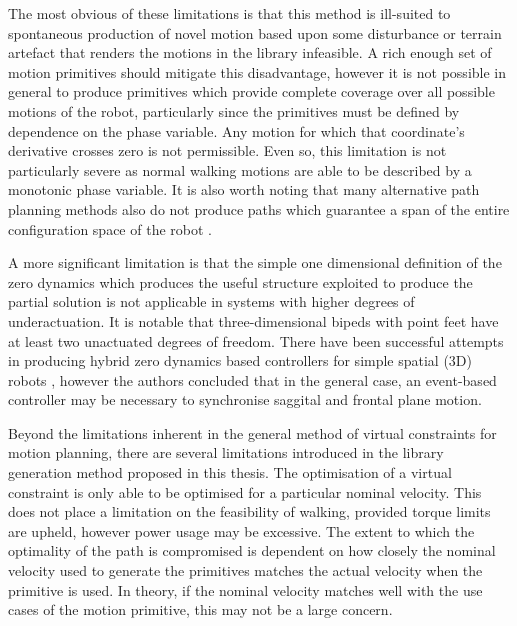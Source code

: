 The most obvious of these limitations is that this method is ill-suited to spontaneous production of novel motion based upon some disturbance or terrain artefact that renders the motions in the library infeasible. A rich enough set of motion primitives should mitigate this disadvantage, however it is not possible in general to produce primitives which provide complete coverage over all possible motions of the robot, particularly since the primitives must be defined by dependence on the phase variable. Any motion for which that coordinate's derivative crosses zero is not permissible. Even so, this limitation is not particularly severe as normal walking motions are able to be described by a monotonic phase variable. It is also worth noting that many alternative path planning methods also do not produce paths which guarantee a span of the entire configuration space of the robot \cite{boor1999gaussian, lavalle2001randomized, frazzoli2002real}. 


A more significant limitation is that the simple one dimensional definition of the zero dynamics which produces the useful structure exploited to produce the partial solution is not applicable in systems with higher degrees of underactuation. It is notable that three-dimensional bipeds with point feet have at least two unactuated degrees of freedom. There have been successful attempts in producing hybrid zero dynamics based controllers for simple spatial (3D) robots \cite{shih2007asymptotically}, however the authors concluded that in the general case, an event-based controller may be necessary to synchronise saggital and frontal plane motion.

Beyond the limitations inherent in the general method of virtual constraints for motion planning, there are several limitations introduced in the library generation method proposed in this thesis. The optimisation of a virtual constraint is only able to be optimised for a particular nominal velocity. This does not place a limitation on the feasibility of walking, provided torque limits are upheld, however power usage may be excessive. The extent to which the optimality of the path is compromised is dependent on how closely the nominal velocity used to generate the primitives matches the actual velocity when the primitive is used. In theory, if the nominal velocity matches well with the use cases of the motion primitive, this may not be a large concern.

